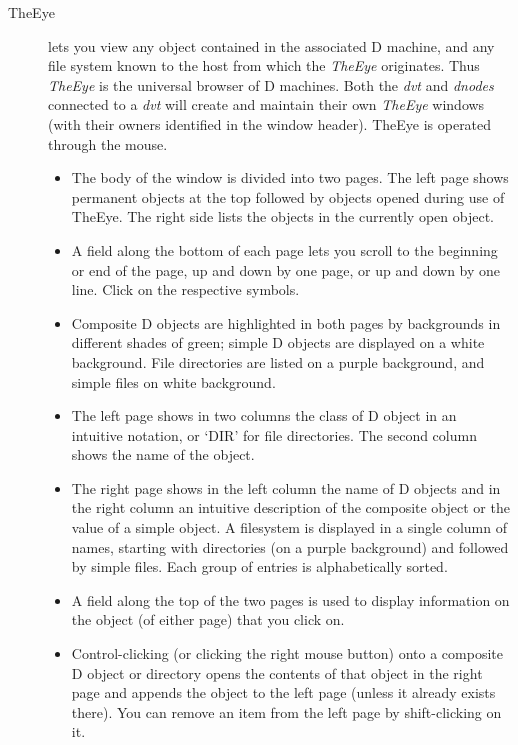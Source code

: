 \begin{description}
\item[TheEye] lets you view any object contained in the associated D machine, and any file system known to the host from which the \emph{TheEye} originates. Thus \emph{TheEye} is the universal browser of D machines. Both the \emph{dvt} and \emph{dnodes} connected to a \emph{dvt} will create and maintain their own \emph{TheEye} windows (with their owners identified in the window header). TheEye is operated through the mouse.

\begin{itemize}
\item The body of the window is divided into two pages. The left page shows permanent objects at the top followed by objects opened during use of TheEye. The right side lists the objects in the currently open object.

\item A field along the bottom of each page lets you scroll to the beginning or end of the page, up and down by one page, or up and down by one line. Click on the respective symbols.

\item Composite D objects are highlighted in both pages by backgrounds in different shades of green; simple D objects are displayed on a white background. File directories are listed on a purple background, and simple files on white background.

\item The left page shows in two columns the class of D object in an intuitive notation, or `DIR' for file directories. The second column shows the name of the object.

\item The right page shows in the left column the name of D objects and in the right column an intuitive description of the composite object or the value of a simple object. A filesystem is displayed in a single column of names, starting with directories (on a purple background) and followed by simple files. Each group of entries is alphabetically sorted.

\item A field along the top of the two pages is used to display information on the object (of either page) that you click on.

\item Control-clicking (or clicking the right mouse button) onto a composite D object or directory opens the contents of that object in the right page and appends the object to the left page (unless it already exists there). You can remove an item from the left page by shift-clicking on it.


\end{itemize}
\end{description}
